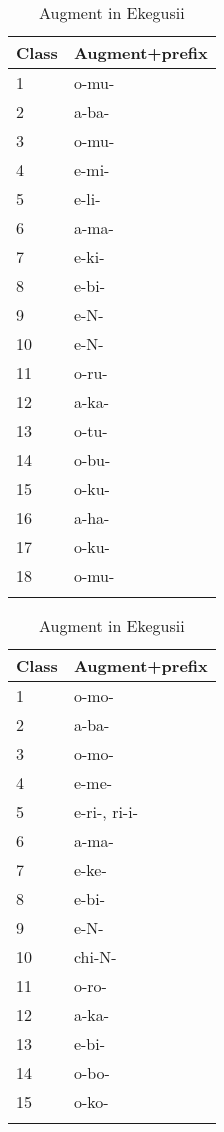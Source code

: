 \documentclass[output=paper]{langscibook}
\begin{document}
\vfill
\begin{table}[H]
\caption{Augments in Haya and Ekegusii\label{hayagusii8}}
\begin{subtable}[t]{.5\textwidth}\centering
\caption{Augment in Haya\label{hayagusii8:a}}
\begin{tabular}{ll}
\lsptoprule
Class &	Augment+prefix\\\midrule
1  &	o-mu-\\
2  &	a-ba-\\
3  &	o-mu-\\
4  &	e-mi-\\
5  &	e-li-\\
6  &	a-ma-\\
7  &	e-ki-\\
8  &	e-bi-\\
9  &	e-N-\\
10 &	e-N-\\
11 &	o-ru-\\
12 &    a-ka-\\
13 &	o-tu-\\
14 &	o-bu-\\
15 &	o-ku-\\
16 &	a-ha-\\
17 &	o-ku-\\
18 &	o-mu-\\
\lspbottomrule
\end{tabular}
\end{subtable}\begin{subtable}[t]{.5\textwidth}\centering
\caption{Augment in Ekegusii\label{hayagusii8:b}}
\begin{tabular}{ll}
\lsptoprule
 Class	&	Augment+prefix \\\midrule
   1	&	o-mo- \\
   2	&	a-ba- \\
   3	&	o-mo- \\
   4	&	e-me- \\
   5	&	e-ri-, ri-i- \\
   6	&	a-ma-\\
   7	&	e-ke-\\
   8	&	e-bi- \\
   9	&	e-N- \\
   10	&	chi-N- \\
   11	&	o-ro- \\
   12	&	a-ka- \\
   13	&	e-bi- \\
   14	&	o-bo- \\
   15	&	o-ko- \\
\lspbottomrule
\end{tabular}
\end{subtable}
\end{table}
\vfill\hbox{}\pagebreak
\end{document}
